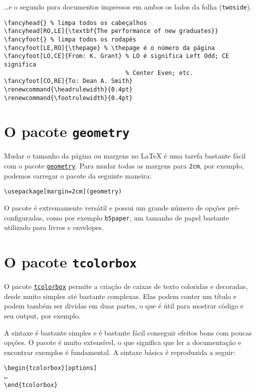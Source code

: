 \documentclass[a4paper]{article}
\newcommand{\code}[1]{\texttt{#1}}
\begin{document}
…e o segundo para documentos impressos em ambos os lados da folha
(\code{twoside}).

\begin{verbatim}
\fancyhead{} % limpa todos os cabeçalhos
\fancyhead[RO,LE]{\textbf{The performance of new graduates}}
\fancyfoot{} % limpa todos os rodapés
\fancyfoot[LE,RO]{\thepage} % \thepage é o número da página
\fancyfoot[LO,CE]{From: K. Grant} % LO é significa Left Odd; CE significa
                                  % Center Even; etc.
\fancyfoot[CO,RE]{To: Dean A. Smith}
\renewcommand{\headrulewidth}{0.4pt}
\renewcommand{\footrulewidth}{0.4pt}
\end{verbatim}

\section{O pacote \code{geometry}}

Mudar o tamanho da página ou margens no \LaTeX{} é uma tarefa bastante fácil
com o pacote \href{https://www.ctan.org/pkg/geometry}{\code{geometry}}. Para
mudar todas as margens para \code{2cm}, por exemplo, podemos carregar o pacote
da seguinte maneira:

\begin{verbatim}
\usepackage[margin=2cm](geometry)
\end{verbatim}

O pacote é extremamente versátil e possui um grande número de opções
pré-configuradas, como por exemplo \code{b5paper}, um tamanho de papel bastante
utilizado para livros e envelopes.

\section{O pacote \code{tcolorbox}}

O pacote \href{https://www.ctan.org/pkg/tcolorbox}{\code{tcolorbox}} permite a
criação de caixas de texto coloridas e decoradas, desde muito simples até
bastante complexas. Elas podem conter um título e podem também ser dividas em
duas partes, o que é útil para mostrar código e seu output, por exemplo.

A sintaxe é bastante simples e é bastante fácil conseguir efeitos bons com
poucas opções. O pacote é muito extensível, o que significa que ler a
documentação e encontrar exemplos é fundamental. A sintaxe básica é reproduzida
a seguir:

\begin{verbatim}
\begin{tcolorbox}[options]
…
\end{tcolorbox}
\end{verbatim}
\end{document}
